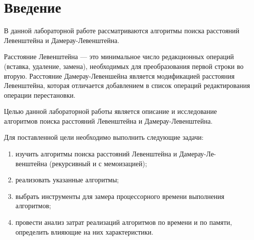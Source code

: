 \chapter*{Введение}

В данной лабораторной работе рассматриваются алгоритмы поиска расстояний Левенштейна и Дамерау-Левенштейна.

Расстояние Левенштейна --- это минимальное число редакционных операций (вставка, удаление, замена), необходимых для преобразования первой строки во вторую. Расстояние Дамерау-Левеншейна является модификацией расстояния Левенштейна, которая отличается добавлением в список операций редактирования операции перестановки.



Целью данной лабораторной работы является описание и исследование алгоритмов поиска расстояний Левенштейна и Дамерау-Левенштейна.

Для поставленной цели необходимо выполнить следующие задачи:
\begin{enumerate}[label=---]
	\item изучить алгоритмы поиска расстояний Левенштейна и Дамерау-Ле-\\венштейна (рекурсивный и с мемоизацией);
	\item реализовать указанные алгоритмы;
	\item выбрать инструменты для замера процессорного времени выполнения алгоритмов;
	\item провести анализ затрат реализаций алгоритмов по времени и по памяти, определить влияющие на них характеристики.
\end{enumerate}